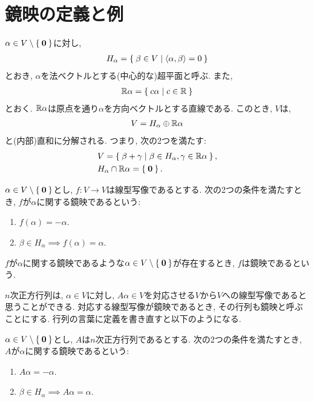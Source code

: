 \section{鏡映の定義と例}


$\alpha \in V\setminus\Set{\boldsymbol{0}}$に対し,
\begin{align*}
  H_\alpha = \Set{\beta \in V | \Braket{\alpha,\beta}=0}
\end{align*}
とおき, $\alpha$を法ベクトルとする(中心的な)超平面と呼ぶ.
また,
\begin{align*}
  \mathbb{R}\alpha = \Set{c \alpha | c\in \mathbb{R}}
\end{align*}
とおく. $\mathbb{R}\alpha$は原点を通り$\alpha$を方向ベクトルとする直線である.
このとき, $V$は,
\begin{align*}
  V =   H_\alpha \oplus   \mathbb{R}\alpha
\end{align*}
と(内部)直和に分解される.
つまり, 次の2つを満たす:
\begin{align*}
  &V = \Set{ \beta + \gamma | \beta \in H_\alpha, \gamma \in \mathbb{R}\alpha},\\
  &H_\alpha \cap   \mathbb{R}\alpha =\Set{\boldsymbol{0}}.
\end{align*}

\begin{definition}
  $\alpha \in V\setminus\Set{\boldsymbol{0}}$とし,
  $f\colon V\to V$は線型写像であるとする.
  次の2つの条件を満たすとき,
  $f$が$\alpha$に関する鏡映であるという:
  \begin{enumerate}
  \item $f(\alpha)=-\alpha$.
  \item $\beta \in H_\alpha \implies f(\alpha)=\alpha$.    
  \end{enumerate}
  $f$が$\alpha$に関する鏡映であるような$\alpha\in V\setminus\Set{\boldsymbol{0}}$が存在するとき,
  $f$は鏡映であるという.
\end{definition}
$n$次正方行列は,
$\alpha\in V$に対し,
$A\alpha\in V$を対応させる$V$から$V$への線型写像であると思うことができる.
対応する線型写像が鏡映であるとき, その行列も鏡映と呼ぶことにする.
行列の言葉に定義を書き直すと以下のようになる.
\begin{definition}
  $\alpha \in V\setminus\Set{\boldsymbol{0}}$とし,
  $A$は$n$次正方行列であるとする.
  次の2つの条件を満たすとき,
  $A$が$\alpha$に関する鏡映であるという:
  \begin{enumerate}
  \item $A\alpha=-\alpha$.
  \item $\beta \in H_\alpha \implies A\alpha=\alpha$.    
  \end{enumerate}
\end{definition}

